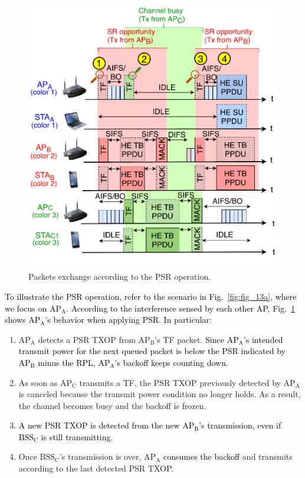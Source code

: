\documentclass{ieeeaccess}
\begin{document}
\begin{figure}[ht!]
	\centering
	\includegraphics[width=.95\columnwidth]{fig_13b}
	\caption{Packets exchange according to the PSR operation.}
	\label{fig:fig_13b}
\end{figure}

\textcolor{black}{To illustrate the PSR operation, refer to the scenario in Fig.~\ref{fig:fig_13a}, where we focus on $\text{AP}_\text{A}$. According to the interference sensed by each other AP, Fig.~\ref{fig:fig_13b} shows $\text{AP}_\text{A}$'s behavior when applying PSR. In particular:}
\begin{enumerate}
	\item $\text{AP}_\text{A}$ detects a PSR TXOP from $\text{AP}_\text{B}$'s TF packet. \textcolor{black}{Since $\text{AP}_\text{A}$'s intended transmit power for the next queued packet is below the PSR indicated by $\text{AP}_\text{B}$ minus the RPL, $\text{AP}_\text{A}$'s backoff keeps counting down.}
	\item As soon as $\text{AP}_\text{C}$ transmits a TF, the PSR TXOP previously detected by $\text{AP}_\text{A}$ is canceled because the transmit power condition no longer holds. As a result, the channel becomes busy and the backoff is frozen.
	\item \textcolor{black}{A new PSR TXOP is detected  from the new $\text{AP}_\text{B}$'s transmission, even if $\text{BSS}_\text{C}$ is still transmitting.}
	\item Once $\text{BSS}_\text{C}$'s transmission is over, $\text{AP}_\text{A}$ \textcolor{black}{consumes the backoff} and transmits according to the last detected PSR TXOP.
\end{enumerate}
\end{document}
